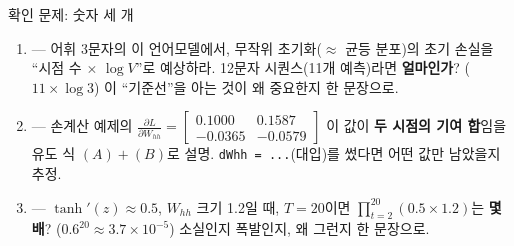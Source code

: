 \begin{frame}[fragile]{확인 문제: 숫자 세 개}
  \begin{enumerate}
    \item {} --- 어휘 3문자의 이 언어모델에서, 무작위
      초기화($\approx$ 균등 분포)의 초기 손실을 ``시점 수 $\times$
      $\log V$''로 예상하라. 12문자 시퀀스(11개 예측)라면
      \textbf{얼마인가}? ($11 \times \log 3$) 이 ``기준선''을
      아는 것이 왜 중요한지 한 문장으로.
    \item {} --- 손계산 예제의
      $\frac{\partial L}{\partial W_{hh}} = \begin{bmatrix}
      0.1000 & 0.1587 \\ -0.0365 & -0.0579 \end{bmatrix}$ 이 값이
      \textbf{두 시점의 기여 합}임을 유도 식 $(A)+(B)$로 설명.
      \verb|dWhh = ...|(대입)를 썼다면 어떤 값만 남았을지 추정.
    \item {} --- $\tanh'(z) \approx 0.5$, $W_{hh}$ 크기
      1.2일 때, $T=20$이면 $\prod_{t=2}^{20} (0.5 \times 1.2)$는
      \textbf{몇 배}? ($0.6^{20} \approx 3.7 \times 10^{-5}$)
      소실인지 폭발인지, 왜 그런지 한 문장으로.
  \end{enumerate}
\end{frame}
